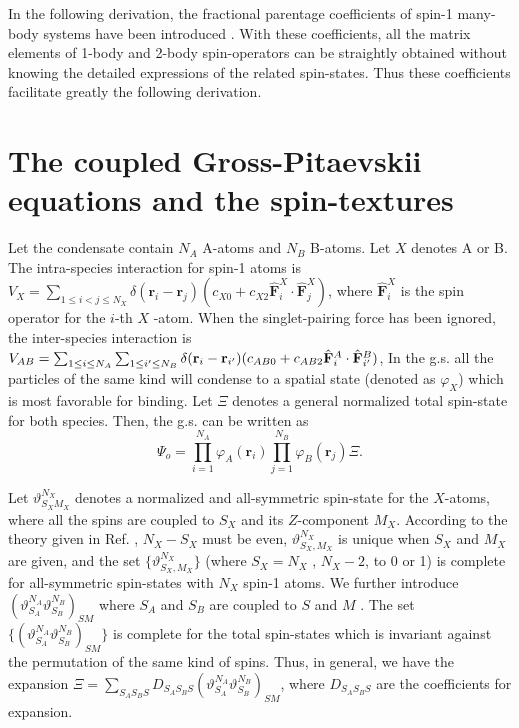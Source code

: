 \documentclass[10pt]{wlscirep}
\begin{document}
In the following derivation, the fractional
parentage coefficients of spin-1 many-body systems have been introduced
\cite{bao05,bao06}. With these coefficients, all the
matrix elements of 1-body and 2-body spin-operators can be straightly
obtained without knowing the detailed expressions of the related
spin-states. Thus these coefficients facilitate greatly the following
derivation.



\section*{The coupled Gross-Pitaevskii equations and the spin-textures}

Let the condensate contain $N_{A}$ A-atoms and $N_{B}$ B-atoms. Let $X$
denotes A or B. The intra-species interaction for spin-1 atoms is $%
V_{X}=\sum_{1\leq i<j\leq N_{X}}\delta (\mathbf{r}_{i}-\mathbf{r}%
_{j})(c_{X0}+c_{X2}\hat{\mathbf{F}}_{i}^{X}\cdot \hat{\mathbf{F}}_{j}^{X})$,
where $\hat{\mathbf{F}}_{i}^{X}$ is the spin operator for the $i$-th $X$%
-atom. When the singlet-pairing force has been ignored, the inter-species
interaction is $V_{AB}=\sum_{1\leq i\leq N_{A}}\sum_{1\leq i^{\prime }\leq
N_{B}}\delta (\mathbf{r}_{i}-\mathbf{r}_{i^{\prime }})(c_{AB0}+c_{AB2}\hat{%
\mathbf{F}}_{i}^{A}\cdot \hat{\mathbf{F}}_{i^{\prime }}^{B})$, In the g.s.
all the particles of the same kind will condense to a spatial state (denoted
as $\varphi _{X}$) which is most favorable for binding. Let $\Xi $ denotes a
general normalized total spin-state for both species. Then, the g.s. can be
written as
\begin{equation}
\Psi _{o}=\prod_{i=1}^{N_{A}}\varphi _{A}(\mathbf{r}_{i})\prod_{j=1}^{N_{B}}%
\varphi _{B}(\mathbf{r}_{j})\Xi .  \label{twf}
\end{equation}

Let $\vartheta_{S_XM_X}^{N_X}$ denotes a normalized and all-symmetric
spin-state for the $X$-atoms, where all the spins are coupled to $S_X$ and
its $Z$-component $M_X$. According to the theory given in Ref. ,
$N_X-S_X$ must be even, $\vartheta_{S_X,M_X}^{N_X}$ is unique when $S_X$ and
$M_X$ are given, and the set $\{\vartheta_{S_X,M_X}^{N_X}\}$ (where $S_X=N_X$%
, $N_X-2$, to 0 or 1) is complete for all-symmetric spin-states with $N_X$
spin-1 atoms. We further introduce $(\vartheta_{S_A}^{N_A}%
\vartheta_{S_B}^{N_B})_{SM}$ where $S_A$ and $S_B$ are coupled to $S$ and $M$
. The set $\{(\vartheta_{S_A}^{N_A}\vartheta_{S_B}^{N_B})_{SM}\}$ is
complete for the total spin-states which is invariant against the
permutation of the same kind of spins. Thus, in general, we have the
expansion $\Xi=\sum_{S_AS_BS}D_{S_AS_BS}(\vartheta_{S_A}^{N_A}%
\vartheta_{S_B}^{N_B})_{SM}$, where $D_{S_AS_BS}$ are the coefficients for
expansion.
\end{document}
